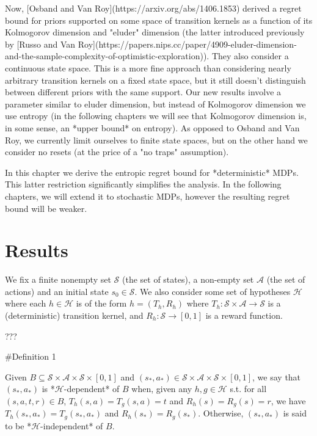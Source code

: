 \documentclass[a4paper]{article}
\newcommand{\AP}[1]{\left(#1\right)}
\newcommand{\A}{\mathcal{A}}
\newcommand{\St}{\mathcal{S}}
\newcommand{\Hy}{\mathcal{H}}
\begin{document}
Now, [Osband and Van Roy](https://arxiv.org/abs/1406.1853) derived a regret bound for priors supported on some space of transition kernels as a function of its Kolmogorov dimension and "eluder" dimension (the latter introduced previously by [Russo and Van Roy](https://papers.nips.cc/paper/4909-eluder-dimension-and-the-sample-complexity-of-optimistic-exploration)). They also consider a continuous state space. This is a more fine approach than considering nearly arbitrary transition kernels on a fixed state space, but it still doesn't distinguish between different priors with the same support. Our new results involve a parameter similar to eluder dimension, but instead of Kolmogorov dimension we use entropy (in the following chapters we will see that Kolmogorov dimension is, in some sense, an *upper bound* on entropy). As opposed to Osband and Van Roy, we currently limit ourselves to finite state spaces, but on the other hand we consider no resets (at the price of a "no traps" assumption).

In this chapter we derive the entropic regret bound for *deterministic* MDPs. This latter restriction significantly simplifies the analysis. In the following chapters, we will extend it to stochastic MDPs, however the resulting regret bound will be weaker.

\section{Results}

We fix a finite nonempty set $\St$ (the set of states), a non-empty set $\A$ (the set of actions) and an initial state $s_0 \in \St$. We also consider some set of hypotheses $\Hy$ where each $h\in\Hy$ is of the form $h=\AP{T_h,R_h}$ where $T_h: \St \times \A \rightarrow \St$ is a (deterministic) transition kernel, and $R_h: \St \rightarrow [0,1]$ is a reward function.

??? %

\#Definition 1

Given $B \subseteq \St \times \A \times \St \times [0,1]$ and $\AP{s_*,a_*} \in \St \times \A \times \St \times [0,1]$, we say that $\AP{s_*,a_*}$ is *$\Hy$-dependent* of $B$ when, given any $h,g\in\Hy$ s.t. for all $(s,a,t,r) \in B$, $T_h(s,a) = T_g(s,a)=t$ and $R_h(s) = R_g(s)=r$, we have $T_h\AP{s_*,a_*}=T_g\AP{s_*,a_*}$ and $R_h\AP{s_*}=R_g\AP{s_*}$. Otherwise, $\AP{s_*,a_*}$ is said to be *$\Hy$-independent* of $B$.
\end{document}
